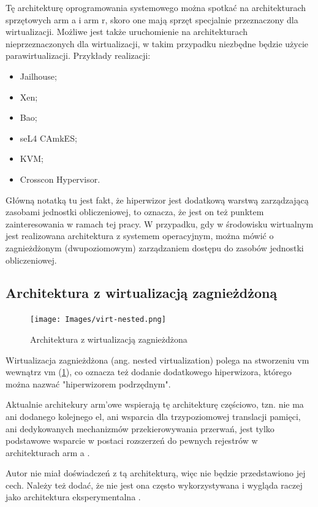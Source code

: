 \documentclass[../../main]{subfiles}
\begin{document}
Tę architekturę oprogramowania systemowego można spotkać na architekturach sprzętowych \acrshort{arm}
\acrshort{a} i \acrshort{arm} \acrshort{r}, skoro one mają sprzęt specjalnie przeznaczony dla
wirtualizacji. Możliwe jest także uruchomienie na architekturach nieprzeznaczonych dla wirtualizacji,
w takim przypadku niezbędne będzie użycie parawirtualizacji. Przykłady realizacji:

\begin{itemize}
    \item Jailhouse;
    \item Xen;
    \item Bao;
    \item seL4 CAmkES;
    \item KVM;
    \item Crosscon Hypervisor.
\end{itemize}

Główną notatką tu jest fakt, że hiperwizor jest dodatkową warstwą zarządzającą zasobami jednostki
obliczeniowej, to oznacza, że jest on też punktem zainteresowania w ramach tej pracy. W przypadku, gdy
w środowisku wirtualnym jest realizowana architektura z systemem operacyjnym, można mówić o
zagnieżdżonym (dwupoziomowym) zarządzaniem dostępu do zasobów jednostki obliczeniowej.

\subsection{Architektura z wirtualizacją zagnieżdżoną}
\begin{figure}[h]
    \centering
    \texttt{[image: Images/virt-nested.png]}
    \caption{Architektura z wirtualizacją zagnieżdżona}
    \label{fig:virt-nestet}
\end{figure}

Wirtualizacja zagnieżdżona (ang. nested virtualization) polega na stworzeniu \acrshort{vm} wewnątrz
\acrshort{vm} (\cref{fig:virt-nestet}), co oznacza też dodanie dodatkowego hiperwizora, którego można
nazwać "hiperwizorem podrzędnym".

Aktualnie architekury \acrshort{arm}'owe wspierają tę architekturę częściowo, tzn. nie ma ani dodanego
kolejnego \acrshort{el}, ani wsparcia dla trzypoziomowej translacji pamięci, ani dedykowanych
mechanizmów przekierowywania przerwań, jest tylko podstawowe wsparcie w postaci rozszerzeń do pewnych rejestrów w architekturach \acrshort{arm} \acrshort{a} \cite{nestvirtarm}.

Autor nie miał doświadczeń z tą architekturą, więc nie będzie przedstawiono jej cech. Należy też
dodać, że nie jest ona często wykorzystywana i wygląda raczej jako architektura eksperymentalna
\cite{nestvirtarm}.
\end{document}
